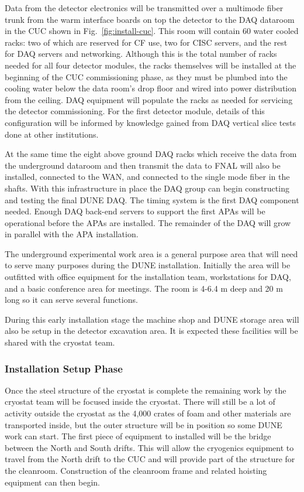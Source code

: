 Data from the detector electronics will be transmitted over a multimode fiber trunk from the warm interface boards on top the detector to the DAQ dataroom in the CUC shown in Fig.~\ref{fig:install-cuc}.  This room will contain 60 water cooled racks: two of which are reserved for CF use, two for CISC servers, and the rest for DAQ servers and networking. Although this is the total number of racks needed for all four detector modules, the racks themselves will be installed at the beginning of the CUC commissioning phase, as they must be plumbed into the cooling water below the data room's drop floor and wired into power distribution from the ceiling.  DAQ equipment will populate the racks as needed for servicing the detector commissioning.  For the first detector module, details of this configuration will be informed by knowledge gained from DAQ vertical slice tests done at other institutions.  

At the same time the eight above ground DAQ racks which receive the data from the underground dataroom and then transmit the data to FNAL will also be installed, connected to the WAN, and connected to the single mode fiber in the shafts. With this infrastructure in place the DAQ group can begin constructing and testing the final DUNE DAQ.  The timing system is the first DAQ component needed.  Enough DAQ back-end servers to support the first APAs will be operational before the APAs are installed.  The remainder of the DAQ will grow in parallel with the APA installation.

The underground experimental work area is a general purpose area that will need to serve many purposes during the DUNE installation. Initially the area will be outfitted with office equipment for the installation team, workstations for DAQ, and a basic conference area for meetings.  The room is 4-6.4 \si{m} deep and 20 \si{m} long so it can serve several functions.

During this early installation stage the machine shop and DUNE storage area will also be setup in the detector excavation area. It is expected these facilities will be shared with the cryostat team. 

\subsubsection{Installation Setup Phase}

Once the steel structure of the cryostat is complete the remaining work by the cryostat team will be focused inside the cryostat. 
There will still be a lot of activity outside the cryostat as the 4,000 crates of foam and other materials are transported inside, but the outer structure will be in position so some DUNE work can start. 
The first piece of equipment to installed will be the bridge between the North and South drifts. 
This will allow the cryogenics equipment to travel from the North drift to the CUC and will provide part of the structure for the cleanroom. 
Construction of the cleanroom frame and related hoisting equipment can then begin. 

